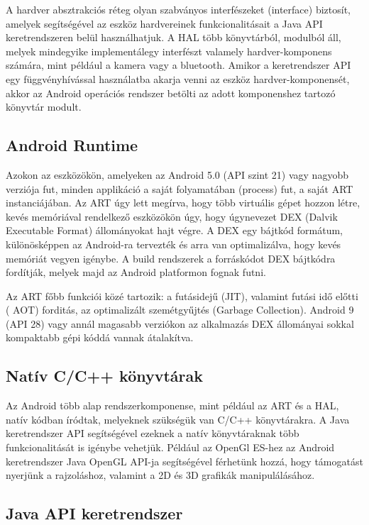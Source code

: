 A hardver absztrakciós réteg olyan szabványos interfészeket (interface) biztosít, amelyek segítségével az eszköz hardvereinek funkcionalitásait a Java API keretrendszeren belül használhatjuk. A HAL több könyvtárból, modulból áll, melyek mindegyike implementálegy interfészt valamely hardver-komponens számára, mint például a kamera vagy a bluetooth. Amikor a keretrendszer API egy függvényhívással használatba akarja venni az eszköz hardver-komponensét, akkor az Android operációs rendszer betölti az adott komponenshez tartozó könyvtár modult.

\subsection{Android Runtime}

Azokon az eszközökön, amelyeken az Android 5.0 (API szint 21) vagy nagyobb verziója fut, minden applikáció a saját folyamatában (process) fut, a saját ART instanciájában. Az ART úgy lett megírva, hogy több virtuális gépet hozzon létre, kevés memóriával rendelkező eszközökön úgy, hogy úgynevezet DEX (Dalvik Executable Format) állományokat hajt végre. A DEX egy bájtkód formátum, különösképpen az Android-ra tervezték és arra van optimalizálva, hogy kevés memóriát vegyen igénybe. A build rendszerek a forráskódot DEX bájtkódra fordítják, melyek majd az Android platformon fognak futni.

Az ART főbb funkciói közé tartozik: a futásidejű (JIT), valamint futási idő előtti ( AOT) forditás, az optimalizált szemétgyűjtés (Garbage Collection). Android 9 (API 28) vagy annál magasabb verziókon az alkalmazás DEX állományai sokkal kompaktabb gépi kóddá vannak átalakítva.

\subsection{Natív C/C++ könyvtárak}

Az Android több alap rendszerkomponense, mint például az ART és a HAL, natív kódban íródtak, melyeknek szükségük van C/C++ könyvtárakra. A Java keretrendszer API segítségével ezeknek a natív könyvtáraknak több funkcionalitását is igénybe vehetjük. Például az OpenGl ES-hez az Android keretrendszer Java OpenGL API-ja segítségével férhetünk hozzá, hogy támogatást nyerjünk a rajzoláshoz, valamint a 2D és 3D grafikák manipulálásához.

\subsection{Java API keretrendszer}

